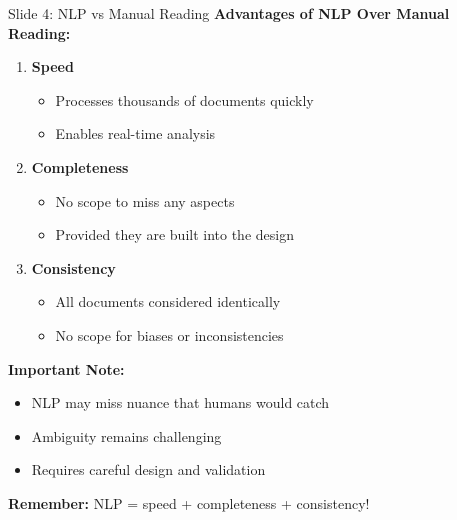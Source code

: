 \documentclass[8pt]{beamer}
\begin{document}
	\begin{frame}{Slide 4: NLP vs Manual Reading}
		\fontsize{6.5}{7.5}\selectfont
		\textbf{Advantages of NLP Over Manual Reading:}
		\begin{enumerate}
			\item \textbf{Speed}
			\begin{itemize}
				\item Processes thousands of documents quickly
				\item Enables real-time analysis
			\end{itemize}
			\item \textbf{Completeness}
			\begin{itemize}
				\item No scope to miss any aspects
				\item Provided they are built into the design
			\end{itemize}
			\item \textbf{Consistency}
			\begin{itemize}
				\item All documents considered identically
				\item No scope for biases or inconsistencies
			\end{itemize}
		\end{enumerate}
		
		\vspace{0.1cm}
		\textbf{Important Note:}
		\begin{itemize}
			\item NLP may miss nuance that humans would catch
			\item Ambiguity remains challenging
			\item Requires careful design and validation
		\end{itemize}
		
		\textcolor{myblue}{\textbf{Remember:}} NLP = \textcolor{myblue}{speed + completeness + consistency}!
	\end{frame}
	
\end{document}
